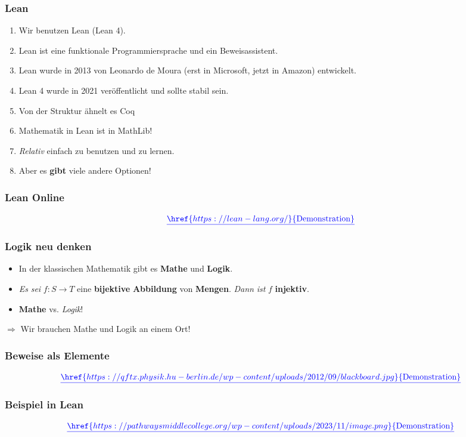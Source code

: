 \documentclass{beamer}
\theoremstyle{definition}
\theoremstyle{remark}
\begin{document}
\begin{frame}
	\frametitle{Lean}
		\begin{enumerate}
			\item Wir benutzen Lean (Lean 4).
			\item Lean ist eine funktionale Programmiersprache und ein Beweisassistent.
			\item Lean wurde in 2013 von Leonardo	de Moura (erst in Microsoft, jetzt in Amazon) entwickelt.
			\item Lean 4 wurde in 2021 veröffentlicht und sollte stabil sein.
			\item Von der Struktur ähnelt es Coq 
			\item Mathematik in Lean ist in MathLib! 
			\item \emph{Relativ} einfach zu benutzen	und zu lernen.
			\item Aber es \textbf{gibt} viele andere Optionen!
		\end{enumerate}
\end{frame}

\begin{frame}
	\frametitle{Lean Online}
	
	\[
		{\color{blue}\underline{\href{https://lean-lang.org/}{\text{Demonstration}}}}
	\]
\end{frame}
\begin{frame}
	\frametitle{Logik neu denken}
	\begin{itemize}
		\item In der klassischen Mathematik gibt es \textbf{Mathe} und \textbf{Logik}.
		\item \emph{Es} \emph{sei}  $f\colon S \to T$ eine \textbf{bijektive} \textbf{Abbildung} von \textbf{Mengen}. \emph{Dann} \emph{ist} $f$ \textbf{injektiv}. 
		\item \textbf{Mathe} vs. \emph{Logik}! \vspace{1cm}
	\end{itemize}
 $\Rightarrow$ Wir brauchen Mathe und Logik an einem Ort!
\end{frame}

\begin{frame}
	\frametitle{Beweise als Elemente}
	\[
		{\color{blue}\underline{\href{https://qftx.physik.hu-berlin.de/wp-content/uploads/2012/09/blackboard.jpg}{\text{Demonstration}}}}
	\]
\end{frame}


\begin{frame}
	\frametitle{Beispiel in Lean}
	\[
		{\color{blue}\underline{\href{https://pathwaysmiddlecollege.org/wp-content/uploads/2023/11/image.png}{\text{Demonstration}}}}
	\]
\end{frame}
\end{document}
